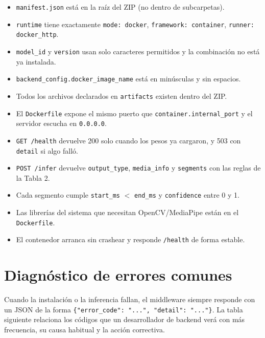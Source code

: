 \documentclass[12pt,a4paper]{article}
\begin{document}
\begin{itemize}[noitemsep, topsep=2pt]
    \item[$\square$] \texttt{manifest.json} está en la raíz del ZIP (no dentro de subcarpetas).
    \item[$\square$] \texttt{runtime} tiene exactamente \texttt{mode: docker}, \texttt{framework: container}, \texttt{runner: docker\_http}.
    \item[$\square$] \texttt{model\_id} y \texttt{version} usan solo caracteres permitidos y la combinación no está ya instalada.
    \item[$\square$] \texttt{backend\_config.docker\_image\_name} está en minúsculas y sin espacios.
    \item[$\square$] Todos los archivos declarados en \texttt{artifacts} existen dentro del ZIP.
    \item[$\square$] El \texttt{Dockerfile} expone el mismo puerto que \texttt{container.internal\_port} y el servidor escucha en \texttt{0.0.0.0}.
    \item[$\square$] \texttt{GET /health} devuelve 200 solo cuando los pesos ya cargaron, y 503 con \texttt{detail} si algo falló.
    \item[$\square$] \texttt{POST /infer} devuelve \texttt{output\_type}, \texttt{media\_info} y \texttt{segments} con las reglas de la Tabla 2.
    \item[$\square$] Cada segmento cumple \texttt{start\_ms} $<$ \texttt{end\_ms} y \texttt{confidence} entre 0 y 1.
    \item[$\square$] Las librerías del sistema que necesitan OpenCV/MediaPipe están en el \texttt{Dockerfile}.
    \item[$\square$] El contenedor arranca sin crashear y responde \texttt{/health} de forma estable.
\end{itemize}

\section{Diagnóstico de errores comunes}

Cuando la instalación o la inferencia fallan, el middleware siempre responde con un JSON de la forma \texttt{\{"error\_code": "...", "detail": "..."\}}. La tabla siguiente relaciona los códigos que un desarrollador de backend verá con más frecuencia, su causa habitual y la acción correctiva.
\end{document}
